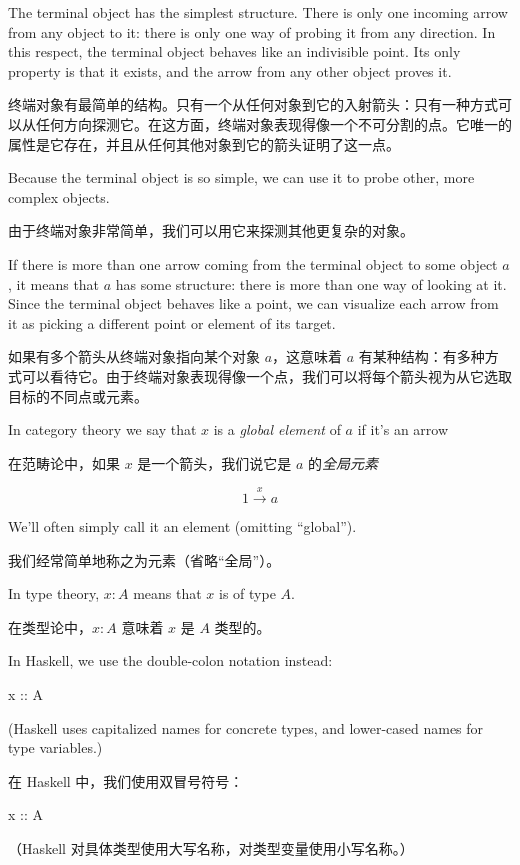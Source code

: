 \documentclass[DaoFP]{subfiles}
\begin{document}
 The terminal object has the simplest structure. There is only one incoming arrow from any object to it: there is only one way of probing it from any direction. In this respect, the terminal object behaves like an indivisible point. Its only property is that it exists, and the arrow from any other object proves it.

 终端对象有最简单的结构。只有一个从任何对象到它的入射箭头：只有一种方式可以从任何方向探测它。在这方面，终端对象表现得像一个不可分割的点。它唯一的属性是它存在，并且从任何其他对象到它的箭头证明了这一点。

 Because the terminal object is so simple, we can use it to probe other, more complex objects.

 由于终端对象非常简单，我们可以用它来探测其他更复杂的对象。

 If there is more than one arrow coming from the terminal object to some object $a$, it means that $a$ has some structure: there is more than one way of looking at it. Since the terminal object behaves like a point, we can visualize each arrow from it as picking a different point or element of its target.

 如果有多个箭头从终端对象指向某个对象 $a$，这意味着 $a$ 有某种结构：有多种方式可以看待它。由于终端对象表现得像一个点，我们可以将每个箭头视为从它选取目标的不同点或元素。

 In category theory we say that $ x$ is a \emph{global element} of $a$ if it's an arrow

 在范畴论中，如果 $x$ 是一个箭头，我们说它是 $a$ 的\emph{全局元素}

 \[ 1 \xrightarrow x a \]

 We'll often simply call it an element (omitting ``global'').

 我们经常简单地称之为元素（省略“全局”）。

 In type theory, $ x \colon A$ means that $x$ is of type $A$.

 在类型论中，$x \colon A$ 意味着 $x$ 是 $A$ 类型的。

 In Haskell, we use the double-colon notation instead:
 \begin{haskell}
  x :: A
 \end{haskell}
 (Haskell uses capitalized names for concrete types, and lower-cased names for type variables.)

 在 Haskell 中，我们使用双冒号符号：
 \begin{haskell}
  x :: A
 \end{haskell}
 （Haskell 对具体类型使用大写名称，对类型变量使用小写名称。）
\end{document}
